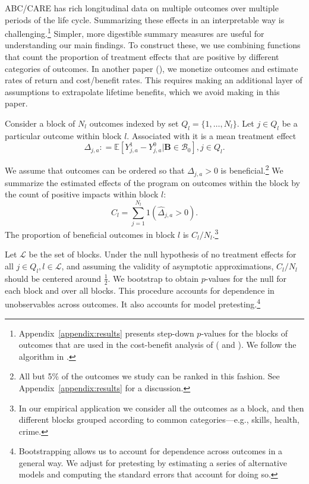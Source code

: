 ABC/CARE has rich longitudinal data on multiple outcomes over multiple periods of the life cycle. Summarizing these effects in an interpretable way is challenging.\footnote{Appendix~\ref{appendix:results} presents step-down $p$-values for the blocks of outcomes that are used in the cost-benefit analysis of \citet{Garcia_Heckman_Leaf_etal_2017_Comp_CBA_Unpublished} (\citealp{Lehman_Romano_2005_AnnStat} and \citealp{Romano_Shaikh_2006_AnnStat}). We follow the algorithm in \citet{Romano_Wolf_2016_pval_SaPL}.} Simpler, more digestible summary measures are useful for understanding our main findings. To construct these, we use combining functions that count the proportion of treatment effects that are positive by different categories of outcomes. In another paper (\citealp{Garcia_Heckman_Leaf_etal_2017_Comp_CBA_Unpublished}), we monetize outcomes and estimate rates of return and cost/benefit rates. This requires making an additional layer of assumptions to extrapolate lifetime benefits, which we avoid making in this paper.

Consider a block of $N_l$ outcomes indexed by set $Q_l = \{1,\dots,N_l\}$. Let $j \in Q_l$ be a particular outcome within block $l$. Associated with it is a mean treatment effect
\begin{equation}
\Delta_{j,a} : = \mathbb{E} \left[ Y^1_{j,a} - Y^0_{j,a} | \bm{B} \in \mathcal{B}_0 \right], j \in Q_l.
\end{equation}

We assume that outcomes can be ordered so that $\Delta_{j,a} >0$ is beneficial.\footnote{All but 5\% of the outcomes we study can be ranked in this fashion. See Appendix~\ref{appendix:results} for a discussion.} We summarize the estimated effects of the program on outcomes within the block by the count of positive impacts within block $l$:
\begin{equation}
C_l = \sum^{N_l}_{j=1} 1 (\hat{\Delta}_{j,a} >0).
\end{equation}
The proportion of beneficial outcomes in block $l$ is $C_l / N_l$.\footnote{In our empirical application we consider all the outcomes as a block, and then different blocks grouped according to common categories---e.g., skills, health, crime.}

Let $\mathcal{L}$ be the set of blocks. Under the null hypothesis of no treatment effects for all $j \in Q_l, l \in \mathcal{L}$, and assuming the validity of asymptotic approximations, $C_l / N_l$ should be centered around $\frac{1}{2}$. We bootstrap to obtain $p$-values for the null for each block and over all blocks. This procedure accounts for dependence in unobservables across outcomes. It also accounts for model pretesting.\footnote{Bootstrapping allows us to account for dependence across outcomes in a general way. We adjust for pretesting by estimating a series of alternative models and computing the standard errors that account for doing so.}

